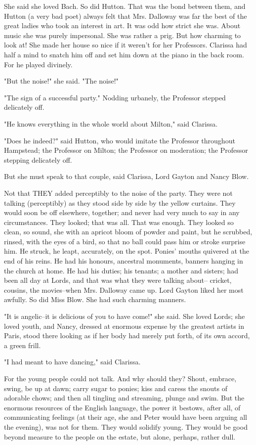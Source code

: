 \documentclass[lang=cn,10pt]{elegantbook}
\begin{document}
She said she loved Bach.  So did Hutton.  That was the bond between
them, and Hutton (a very bad poet) always felt that Mrs. Dalloway
was far the best of the great ladies who took an interest in art.
It was odd how strict she was.  About music she was purely
impersonal.  She was rather a prig.  But how charming to look at!
She made her house so nice if it weren't for her Professors.
Clarissa had half a mind to snatch him off and set him down at the
piano in the back room.  For he played divinely.

"But the noise!" she said.  "The noise!"

"The sign of a successful party."  Nodding urbanely, the Professor
stepped delicately off.

"He knows everything in the whole world about Milton," said
Clarissa.

"Does he indeed?" said Hutton, who would imitate the Professor
throughout Hampstead; the Professor on Milton; the Professor on
moderation; the Professor stepping delicately off.

But she must speak to that couple, said Clarissa, Lord Gayton and
Nancy Blow.

Not that THEY added perceptibly to the noise of the party.  They
were not talking (perceptibly) as they stood side by side by the
yellow curtains.  They would soon be off elsewhere, together; and
never had very much to say in any circumstances.  They looked; that
was all.  That was enough.  They looked so clean, so sound, she
with an apricot bloom of powder and paint, but he scrubbed, rinsed,
with the eyes of a bird, so that no ball could pass him or stroke
surprise him.  He struck, he leapt, accurately, on the spot.
Ponies' mouths quivered at the end of his reins.  He had his
honours, ancestral monuments, banners hanging in the church at
home.  He had his duties; his tenants; a mother and sisters; had
been all day at Lords, and that was what they were talking about--
cricket, cousins, the movies--when Mrs. Dalloway came up.  Lord
Gayton liked her most awfully.  So did Miss Blow.  She had such
charming manners.

"It is angelic--it is delicious of you to have come!" she said.
She loved Lords; she loved youth, and Nancy, dressed at enormous
expense by the greatest artists in Paris, stood there looking as if
her body had merely put forth, of its own accord, a green frill.

"I had meant to have dancing," said Clarissa.

For the young people could not talk.  And why should they?  Shout,
embrace, swing, be up at dawn; carry sugar to ponies; kiss and
caress the snouts of adorable chows; and then all tingling and
streaming, plunge and swim.  But the enormous resources of the
English language, the power it bestows, after all, of communicating
feelings (at their age, she and Peter would have been arguing all
the evening), was not for them.  They would solidify young.  They
would be good beyond measure to the people on the estate, but
alone, perhaps, rather dull.
\end{document}
